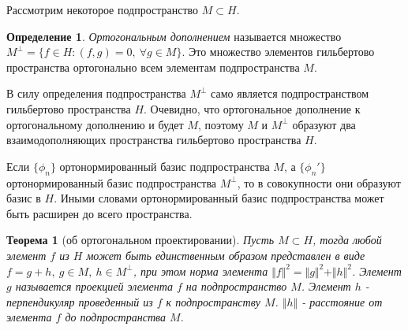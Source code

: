\documentclass[14pt,a4paper]{extarticle}
\newtheorem{theorem}{Теорема}[section]
\theoremstyle{definition}
\newtheorem{definition}{Определение}[section]
\theoremstyle{remark}
\renewcommand{\[}{\begin{dmath*}[compact]}
\renewcommand{\]}{\end{dmath*}}
\newcommand{\sep}{ , \ \allowbreak }
\begin{document}
Рассмотрим некоторое подпространство $M \subset H$.

\begin{definition}
  \textit{Ортогональным дополнением} называется множество
  $M^\bot = \{f \in H: (f,g) = 0 \sep \forall g \in M\}$.
  Это множество элементов гильбертово пространства ортогонально всем
  элементам подпространства $M$.
\end{definition}

В силу определения подпространства $M^\bot$ само является подпространством
гильбертово пространства $H$.
Очевидно, что ортогональное дополнение к ортогональному дополнению и будет $M$,
поэтому $M$ и $M^\bot$ образуют два взаимодополняющих пространства
гильбертово пространства $H$.

Если $\{\phi_n\}$ ортонормированный базис подпространства $M$, а $\{\phi_n'\}$
ортонормированный базис подпространства $M^\bot$, то в совокупности они образуют
базис в $H$.
Иными словами ортонормированный базис подпространства может быть
расширен до всего пространства.

\begin{theorem}[об ортогональном проектировании]
\label{th:об ортогональном проектировании}
  Пусть $M \subset H$, тогда любой элемент $f$ из $H$ может быть
  единственным образом представлен в виде
  $f = g+h \sep g \in M \sep h \in M^\bot$,
  при этом норма элемента $\Vert f \Vert^2 = \Vert g \Vert^2 + \Vert h \Vert^2$.
  Элемент $g$ называется проекцией элемента $f$ на подпространство $M$.
  Элемент $h$ - перпендикуляр проведенный из $f$ к подпространству $M$.
  $\Vert h \Vert$ - расстояние от элемента $f$ до подпространства $M$.
\end{theorem}
\end{document}
